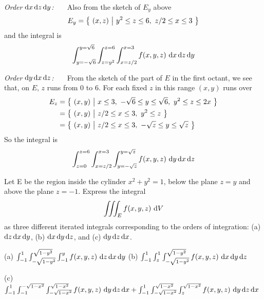 \begin{solution}
\emph{Order $\mathrm{d}x\,\mathrm{d}z\,\mathrm{d}y$:\ \ \ }
Also from the sketch of $E_y$ above
\begin{equation*}
E_y = \Set{(x,z)}{y^2\le z\le 6,\ z/2\le x\le 3}
\end{equation*}
and the integral is
\begin{equation*}
\int_{y=-\sqrt{6}}^{y=\sqrt{6}}\int_{z=y^2}^{z=6}\int_{x=z/2}^{x=3}
                f(x,y,z)\ \mathrm{d}x\,\mathrm{d}z\,\mathrm{d}y 
\end{equation*} 


\emph{Order $\mathrm{d}y\,\mathrm{d}x\,\mathrm{d}z$:\ \ \ }
From the sketch of the part of $E$ in the first octant, we see that,
on $E$, $z$ runs from $0$ to $6$. For each fixed $z$
in this range $(x,y)$ runs over 
\begin{align*}
E_z&=\big\{ \ (x,y)\ \big|\ x\le 3,\ -\sqrt{6}\le y\le \sqrt{6},\ y^2\le z\le 2x\ \big\} \\
&=\big\{ \ (x,y)\ \big|\ z/2\le x\le 3,\ y^2\le z\ \big\} \\
&=\big\{ \ (x,y)\ \big|\ z/2\le x\le 3,\ -\sqrt{z}\le y\le \sqrt{z} \ \big\} 
\end{align*}
So the integral is
\begin{equation*}
\int_{z=0}^{z=6}\int_{x=z/2}^{x=3}\int_{y=-\sqrt{z}}^{y=\sqrt{z}}
                f(x,y,z)\ \mathrm{d}y\,\mathrm{d}x\,\mathrm{d}z 
\end{equation*}
\end{solution}

\begin{question}[M200 2015D] %
Let E be the region inside the cylinder $x^2 + y^2 = 1$, 
below the plane $z = y$ and above the plane $z = -1$. Express 
the integral
\begin{equation*}
\tripInt_E f(x,y,z)\ \dee{V}
\end{equation*}
as three different iterated integrals corresponding to the orders 
of integration: (a) $\mathrm{d}z\, \mathrm{d}x\, \mathrm{d}y$,
(b) $\mathrm{d}x\, \mathrm{d}y\, \mathrm{d}z$, and (c) $\mathrm{d}y\, \mathrm{d}z\, \mathrm{d}x$.
\end{question}

%

\begin{answer}
(a) $\int_{-1}^1\int_{-\sqrt{1-y^2}}^{\sqrt{1-y^2}}
        \int_{-1}^y f(x,y,z)\ \mathrm{d}z\,\mathrm{d}x\,\mathrm{d}y $\qquad
(b) $\int_{-1}^1\int_z^1 \int_{-\sqrt{1-y^2}}^{\sqrt{1-y^2}}
              f(x,y,z)\ \mathrm{d}x\,\mathrm{d}y\,\mathrm{d}z$

(c) $\int_{-1}^1 \int_{-1}^{-\sqrt{1-x^2}} \int_{-\sqrt{1-x^2}}^{\sqrt{1-x^2}}
              f(x,y,z)\ \dee{y}\,\dee{z}\,\dee{x}
       +\int_{-1}^1 \int_{-\sqrt{1-x^2}}^{\sqrt{1-x^2}}
                    \int_z^{\sqrt{1-x^2}}  f(x,y,z)\ \dee{y}\,\dee{z}\,\dee{x}$
\end{answer}

